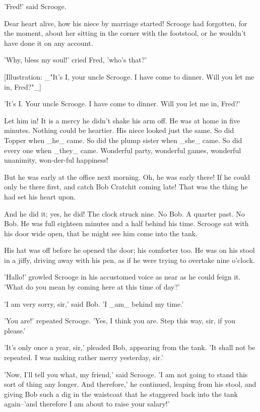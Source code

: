 'Fred!' said Scrooge.

Dear heart alive, how his niece by marriage started! Scrooge had
forgotten, for the moment, about her sitting in the corner with the
footstool, or he wouldn't have done it on any account.

'Why, bless my soul!' cried Fred, 'who's that?'

[Illustration: _"It's I, your uncle Scrooge. I have come to dinner. Will
you let me in, Fred?"_]

'It's I. Your uncle Scrooge. I have come to dinner. Will you let me in,
Fred?'

Let him in! It is a mercy he didn't shake his arm off. He was at home in
five minutes. Nothing could be heartier. His niece looked just the same.
So did Topper when _he_ came. So did the plump sister when _she_ came.
So did every one when _they_ came. Wonderful party, wonderful games,
wonderful unanimity, won-der-ful happiness!

But he was early at the office next morning. Oh, he was early there! If
he could only be there first, and catch Bob Cratchit coming late! That
was the thing he had set his heart upon.

And he did it; yes, he did! The clock struck nine. No Bob. A quarter
past. No Bob. He was full eighteen minutes and a half behind his time.
Scrooge sat with his door wide open, that he might see him come into the
tank.

His hat was off before he opened the door; his comforter too. He was on
his stool in a jiffy, driving away with his pen, as if he were trying to
overtake nine o'clock.

'Hallo!' growled Scrooge in his accustomed voice as near as he could
feign it. 'What do you mean by coming here at this time of day?'

'I am very sorry, sir,' said Bob. 'I _am_ behind my time.'

'You are!' repeated Scrooge. 'Yes, I think you are. Step this way, sir,
if you please.'

'It's only once a year, sir,' pleaded Bob, appearing from the tank. 'It
shall not be repeated. I was making rather merry yesterday, sir.'

'Now, I'll tell you what, my friend,' said Scrooge. 'I am not going to
stand this sort of thing any longer. And therefore,' he continued,
leaping from his stool, and giving Bob such a dig in the waistcoat that
he staggered back into the tank again--'and therefore I am about to
raise your salary!'

